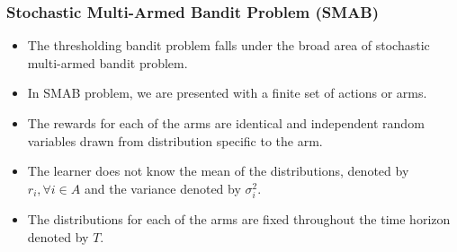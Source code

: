 \begin{frame}
\frametitle{Stochastic Multi-Armed Bandit Problem (SMAB)}
\begin{itemize}
\item<1-> The thresholding bandit problem falls under the broad area of stochastic multi-armed bandit problem.
\item<2-> In SMAB problem, we are presented with a finite set of actions or arms. 
\item<3-> The rewards for each of the arms are identical and independent random variables drawn from distribution specific to the arm.
\item<4-> The learner does not know the mean of the distributions, denoted by $r_{i},\forall i\in A$ and the variance denoted by $\sigma_i^2$. 
\item<5-> The distributions for each of the arms are fixed throughout the time horizon denoted by $T$. 
\end{itemize}
\end{frame}


